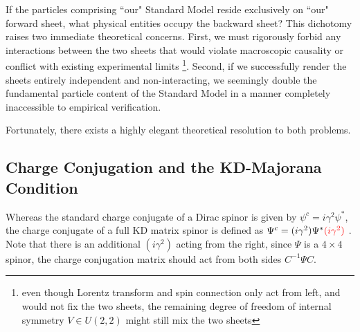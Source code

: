 If the particles comprising ``our" Standard Model reside exclusively on ``our" forward sheet, what physical entities occupy the backward sheet? This dichotomy raises two immediate theoretical concerns. First, we must rigorously forbid any interactions between the two sheets that would violate macroscopic causality or conflict with existing experimental limits \footnote{even though Lorentz transform and spin connection only act from left, and would not fix the two sheets, the remaining degree of freedom of internal symmetry $V\in U(2,2)$ might still mix the two sheets}. Second, if we successfully render the sheets entirely independent and non-interacting, we seemingly double the fundamental particle content of the Standard Model in a manner completely inaccessible to empirical verification.

Fortunately, there exists a highly elegant theoretical resolution to both problems. 

\subsection{Charge Conjugation and the KD-Majorana Condition}
Whereas the standard charge conjugate of a Dirac spinor is given by $\psi^c=i\gamma^{2}\psi^{\ast}$, the charge conjugate of a full KD matrix spinor is defined as $\Psi^c=(i\gamma^2)\Psi^{\ast}\textcolor{red}{(i\gamma^2)}$ \cite{Catterall:2020fep, Butt:2021brl}. Note that there is an additional $(i\gamma^2)$ acting from the right, since $\Psi$ is a $4\times 4$ spinor, the charge conjugation matrix should act from both sides $C^{-1}\Psi C$.

